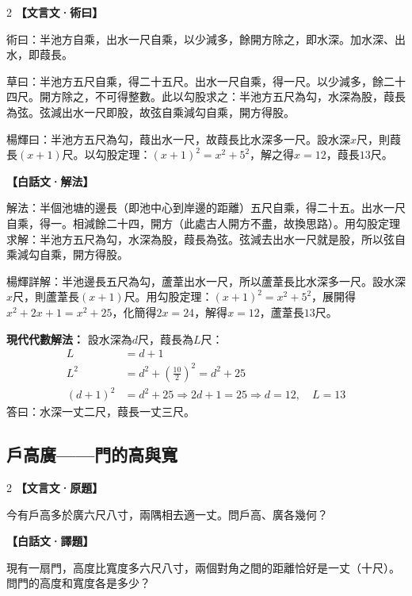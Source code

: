 \documentclass[11pt,a4paper]{article}
\newcommand{\zhc}{}[1]{{\CJKfamily{\CJKrmdefault}#1}}  %
\newcommand{\zhm}[1]{{\CJKfamily{\CJKrmdefault}#1}}  %
\newenvironment{prob bilingual}[1][]{%
  \begin{paracol}{2}%
  \setlength{\columnseprule}{0.4pt}%
}{%
  \end{paracol}%
  \medskip%
}
\begin{document}
\medskip

\begin{paracol}{2}
\switchcolumn[0]
\noindent\textbf{\textcolor{notecolor}{\zhc{【文言文·術曰】}}}\par\smallskip
\zhc{
術曰：半池方自乘，出水一尺自乘，以少減多，餘開方除之，即水深。加水深、出水，即葭長。

草曰：半池方五尺自乘，得二十五尺。出水一尺自乘，得一尺。以少減多，餘二十四尺。開方除之，不可得整數。此以勾股求之：半池方五尺為勾，水深為股，葭長為弦。弦減出水一尺即股，故弦自乘減勾自乘，開方得股。

楊輝曰：半池方五尺為勾，葭出水一尺，故葭長比水深多一尺。設水深$x$尺，則葭長$(x+1)$尺。以勾股定理：$(x+1)^2 = x^2 + 5^2$，解之得$x = 12$，葭長$13$尺。
}

\switchcolumn[1]
\noindent\textbf{\textcolor{notecolor}{\zhm{【白話文·解法】}}}\par\smallskip
\zhm{
解法：半個池塘的邊長（即池中心到岸邊的距離）五尺自乘，得二十五。出水一尺自乘，得一。相減餘二十四，開方（此處古人開方不盡，故換思路）。用勾股定理求解：半池方五尺為勾，水深為股，葭長為弦。弦減去出水一尺就是股，所以弦自乘減勾自乘，開方得股。

楊輝詳解：半池邊長五尺為勾，蘆葦出水一尺，所以蘆葦長比水深多一尺。設水深$x$尺，則蘆葦長$(x+1)$尺。用勾股定理：$(x+1)^2 = x^2 + 5^2$，展開得$x^2 + 2x + 1 = x^2 + 25$，化簡得$2x = 24$，解得$x = 12$，蘆葦長$13$尺。
}
\end{paracol}

\medskip

\noindent\textbf{\textcolor{sectioncolor}{\zhc{現代代數解法：}}}
設水深為$d$尺，葭長為$L$尺：
\begin{align*}
L &= d + 1 \\
L^2 &= d^2 + \left(\frac{10}{2}\right)^2 = d^2 + 25 \\
(d+1)^2 &= d^2 + 25 \Rightarrow 2d + 1 = 25 \Rightarrow d = 12, \quad L = 13
\end{align*}
\zhc{答曰：水深一丈二尺，葭長一丈三尺。}

\vspace{0.5cm}

\subsection{\zhc{戶高廣——門的高與寬}}

\begin{paracol}{2}
\switchcolumn[0]
\noindent\textbf{\textcolor{notecolor}{\zhc{【文言文·原題】}}}\par\smallskip
\zhc{
今有戶高多於廣六尺八寸，兩隅相去適一丈。問戶高、廣各幾何？
}

\switchcolumn[1]
\noindent\textbf{\textcolor{notecolor}{\zhm{【白話文·譯題】}}}\par\smallskip
\zhm{
現有一扇門，高度比寬度多六尺八寸，兩個對角之間的距離恰好是一丈（十尺）。問門的高度和寬度各是多少？
}
\end{paracol}
\end{document}
